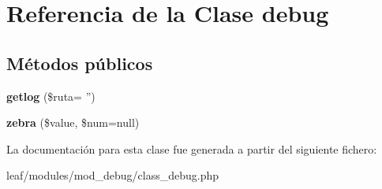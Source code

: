 \hypertarget{classdebug}{\section{Referencia de la Clase debug}
\label{classdebug}
}
\subsection*{Métodos públicos}
\begin{DoxyCompactItemize}
\item 
\hypertarget{classdebug_ac79d98518dd2753471549ca0e7b66e87}{{\bfseries getlog} (\$ruta= '')}\label{classdebug_ac79d98518dd2753471549ca0e7b66e87}

\item 
\hypertarget{classdebug_a6472998e0c4b13f59a2b00473032dc15}{{\bfseries zebra} (\$value, \$num=null)}\label{classdebug_a6472998e0c4b13f59a2b00473032dc15}

\end{DoxyCompactItemize}


La documentación para esta clase fue generada a partir del siguiente fichero\-:\begin{DoxyCompactItemize}
\item 
leaf/modules/mod\-\_\-debug/class\-\_\-debug.\-php\end{DoxyCompactItemize}
